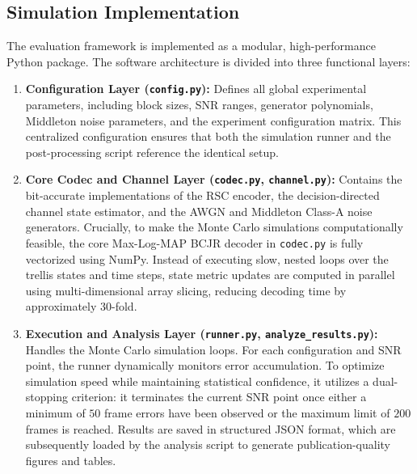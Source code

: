 \documentclass[journal,twocolumn]{IEEEtran}
\begin{document}
\subsection{Simulation Implementation}
The evaluation framework is implemented as a modular, high-performance Python package. The software architecture is divided into three functional layers:
\begin{enumerate}
  \item \textbf{Configuration Layer (\texttt{config.py}):} Defines all global experimental parameters, including block sizes, SNR ranges, generator polynomials, Middleton noise parameters, and the experiment configuration matrix. This centralized configuration ensures that both the simulation runner and the post-processing script reference the identical setup.
  \item \textbf{Core Codec and Channel Layer (\texttt{codec.py}, \texttt{channel.py}):} Contains the bit-accurate implementations of the RSC encoder, the decision-directed channel state estimator, and the AWGN and Middleton Class-A noise generators. Crucially, to make the Monte Carlo simulations computationally feasible, the core Max-Log-MAP BCJR decoder in \texttt{codec.py} is fully vectorized using NumPy. Instead of executing slow, nested loops over the trellis states and time steps, state metric updates are computed in parallel using multi-dimensional array slicing, reducing decoding time by approximately 30-fold.
  \item \textbf{Execution and Analysis Layer (\texttt{runner.py}, \texttt{analyze\_results.py}):} Handles the Monte Carlo simulation loops. For each configuration and SNR point, the runner dynamically monitors error accumulation. To optimize simulation speed while maintaining statistical confidence, it utilizes a dual-stopping criterion: it terminates the current SNR point once either a minimum of $50$ frame errors have been observed or the maximum limit of $200$ frames is reached. Results are saved in structured JSON format, which are subsequently loaded by the analysis script to generate publication-quality figures and tables.
\end{enumerate}
\end{document}
